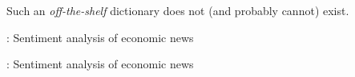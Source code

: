 \documentclass[compress]{beamer}
\begin{document}
\begin{frame}[standout]
	Such an \textit{off-the-shelf} dictionary does not (and probably cannot) exist.
\end{frame}



\begin{frame}{\cite{Boukes2020}: Sentiment analysis of economic news}
\end{frame}


\begin{frame}{\cite{Boukes2020}: Sentiment analysis of economic news}
\end{frame}
\end{document}
